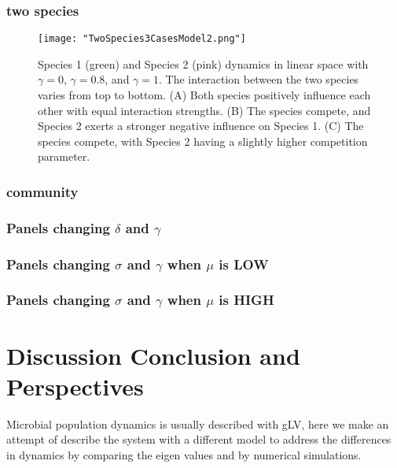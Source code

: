 \documentclass[11pt,a4paper,fleqn]{article}
\begin{document}
\subsubsection{two species}
\begin{figure}[h]
    \centering
    \texttt{[image: "TwoSpecies3CasesModel2.png"]} %
    \caption{\label{Simulation2species} Species 1 (green) and Species 2 (pink) dynamics in linear space with $\gamma=0$, $\gamma=0.8$, and $\gamma=1$. The interaction between the two species varies from top to bottom. 
    (A) Both species positively influence each other with equal interaction strengths. 
    (B) The species compete, and Species 2 exerts a stronger negative influence on Species 1. 
    (C) The species compete, with Species 2 having a slightly higher competition parameter.}
    
\end{figure}

\subsubsection{community}
\subsubsection{Panels changing $\delta$ and $\gamma$}
\subsubsection{Panels changing $\sigma$ and $\gamma$ when $\mu$ is LOW}
\subsubsection{Panels changing $\sigma$ and $\gamma$ when $\mu$ is HIGH}

\section{Discussion Conclusion and Perspectives}
Microbial population dynamics is usually described with gLV, here we make an attempt of describe the system with a different model to address the differences in dynamics by comparing the eigen values and by numerical simulations.
\end{document}
